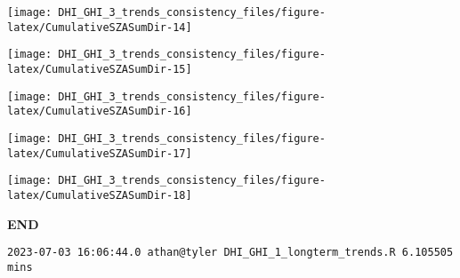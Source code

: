 \documentclass[
  10pt,
  a4paper,oneside]{article}
\begin{document}
\begin{center}\texttt{[image: DHI\_GHI\_3\_trends\_consistency\_files/figure-latex/CumulativeSZASumDir-14]} \end{center}

\begin{center}\texttt{[image: DHI\_GHI\_3\_trends\_consistency\_files/figure-latex/CumulativeSZASumDir-15]} \end{center}

\begin{center}\texttt{[image: DHI\_GHI\_3\_trends\_consistency\_files/figure-latex/CumulativeSZASumDir-16]} \end{center}

\begin{center}\texttt{[image: DHI\_GHI\_3\_trends\_consistency\_files/figure-latex/CumulativeSZASumDir-17]} \end{center}

\begin{center}\texttt{[image: DHI\_GHI\_3\_trends\_consistency\_files/figure-latex/CumulativeSZASumDir-18]} \end{center}

\textbf{END}

\begin{verbatim}
2023-07-03 16:06:44.0 athan@tyler DHI_GHI_1_longterm_trends.R 6.105505 mins
\end{verbatim}
\end{document}
